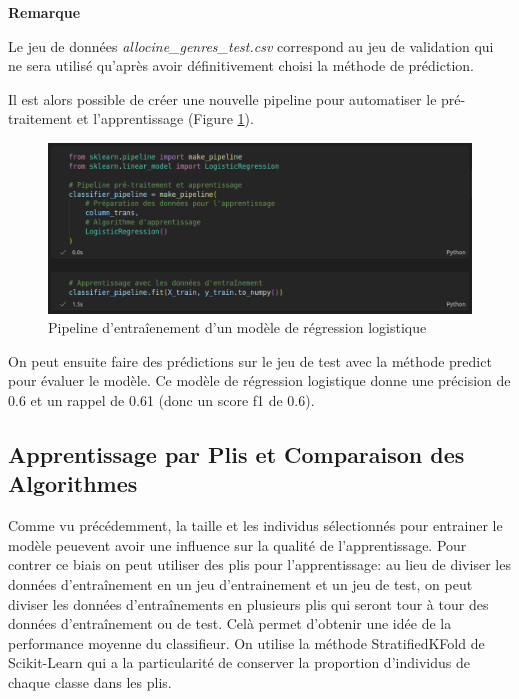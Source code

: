 \noindent
\begin{minipage}[!hc]{0.12\textwidth}
   \textbf{Remarque}
\end{minipage}
\vrule\enskip\vrule\quad\begin{minipage}{\dimexpr 0.87\textwidth-0.8pt-1.5em}
Le jeu de données \textit{allocine\_genres\_test.csv} correspond au jeu de validation qui ne sera utilisé qu'après avoir définitivement choisi la méthode de prédiction.
\end{minipage}

Il est alors possible de créer une nouvelle pipeline pour automatiser le pré-traitement et l'apprentissage (Figure \ref{pipeline_2}).

\begin{figure}
    \center
    \includegraphics[scale=.3]{img/pipeline_2.png}
    \caption{Pipeline d'entraîenement d'un modèle de régression logistique}
    \label{pipeline_2}
\end{figure}

On peut ensuite faire des prédictions sur le jeu de test avec la méthode \textsf{predict} pour évaluer le modèle. Ce modèle de régression logistique donne une précision de 0.6 et un rappel de 0.61 (donc un score f1 de 0.6).

\subsection{Apprentissage par Plis et Comparaison des Algorithmes}
Comme vu précédemment, la taille et les individus sélectionnés pour entrainer le modèle peuevent avoir une influence sur la qualité de l'apprentissage. Pour contrer ce biais on peut utiliser des plis pour l'apprentissage: au lieu de diviser les données d'entraînement en un jeu d'entrainement et un jeu de test, on peut diviser les données d'entraînements en plusieurs plis qui seront tour à tour des données d'entraînement ou de test. Celà permet d'obtenir une idée de la performance moyenne du classifieur. On utilise la méthode \textsf{StratifiedKFold} de Scikit-Learn qui a la particularité de conserver la proportion d'individus de chaque classe dans les plis.

